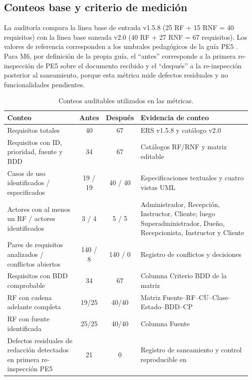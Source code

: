 
\subsection{Conteos base y criterio de medición}
La auditoría compara la línea base de entrada v1.5.8 (25 RF + 15 RNF = 40 requisitos) con la línea base saneada v2.0 (40 RF + 27 RNF = 67 requisitos). Los valores de referencia corresponden a los umbrales pedagógicos de la guía PE5 \cite{guiaPE5}. Para M6, por definición de la propia guía, el ``antes'' corresponde a la primera re-inspección de PE5 sobre el documento recibido y el ``después'' a la re-inspección posterior al saneamiento, porque esta métrica mide defectos residuales y no funcionalidades pendientes.

\begin{table}[H]
\centering
\caption{Conteos auditables utilizados en las métricas.}
\small
\begin{tabularx}{\textwidth}{|p{4.2cm}|c|c|Y|}
\hline
\textbf{Conteo} & \textbf{Antes} & \textbf{Después} & \textbf{Evidencia de conteo}\\\hline
Requisitos totales & 40 & 67 & ERS v1.5.8 y catálogo v2.0\\\hline
Requisitos con ID, prioridad, fuente y BDD & 34 & 67 & Catálogos RF/RNF y matriz editable\\\hline
Casos de uso identificados / especificados & 19 / 19 & 40 / 40 & Especificaciones textuales y cuatro vistas UML\\\hline
Actores con al menos un RF / actores identificados & 3 / 4 & 5 / 5 & Administrador, Recepción, Instructor, Cliente; luego Superadministrador, Dueño, Recepcionista, Instructor y Cliente\\\hline
Pares de requisitos analizados / conflictos abiertos & 140 / 8 & 140 / 0 & Registro de conflictos y decisiones\\\hline
Requisitos con BDD comprobable & 34 & 67 & Columna Criterio BDD de la matriz\\\hline
RF con cadena adelante completa & 19/25 & 40/40 & Matriz Fuente--RF--CU--Clase--Estado--BDD--CP\\\hline
RF con fuente identificada & 25/25 & 40/40 & Columna Fuente\\\hline
Defectos residuales de redacción detectados en primera re-inspección PE5 & 21 & 0 & Registro de saneamiento y control reproducible en \\\hline
\end{tabularx}
\end{table}


